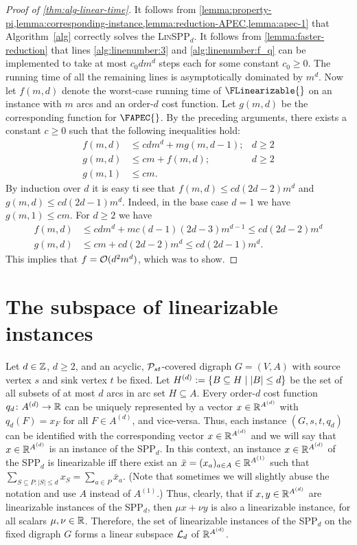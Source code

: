 \begin{proof}[Proof of \cref{thm:alg-linear-time}]
It follows from \cref{lemma:property-pi,lemma:corresponding-instance,lemma:reduction-APEC,lemma:apec-1} that Algorithm~\ref{alg} correctly solves the \textsc{Lin}SPP$_d$. It follows from \cref{lemma:faster-reduction} that lines \ref{alg:linenumber:3} and \ref{alg:linenumber:f_q} can be implemented to take at most $c_0dm^d$ steps each for some constant $c_0 \geq 0$. The running time of all the remaining lines is asymptotically dominated by $m^d$. Now let $f(m, d)$ denote the worst-case running time of $\FLinearizable{}$ on an instance with  $m$ arcs and an order-$d$  cost function.  Let $g(m, d)$ be the corresponding function for $\FAPEC{}$. By the preceding arguments, there exists a constant $c \geq 0$ such that the following inequalities hold:
\begin{align*}
    f(m ,d) &\leq cdm^d + mg(m, d-1); & d \geq 2\\
    g(m, d) &\leq cm + f(m, d); & d \geq 2\\
    g(m, 1) &\leq cm.
\end{align*}
By induction over $d$ it is easy ti see that $f(m, d) \leq cd(2d - 2)m^d$ and $g(m, d) \leq cd(2d - 1)m^d$. Indeed, in the base case $d = 1$ we have $g(m, 1) \leq cm$. For $d \geq 2$ we have 
\begin{align*}
    f(m, d) &\leq cdm^d + mc(d-1)(2d - 3)m^{d-1} \leq cd(2d - 2)m^d \\
    g(m, d) &\leq cm + cd(2d - 2)m^d \leq cd(2d -1)m^d. 
\end{align*}
This implies that $f = \mathcal{O}(d^2m^d)$, which was to show.
\end{proof}

\section{The subspace of linearizable instances}
\label{sec:subspace}

Let $d\in \mathbb{Z}$, $d\ge 2$, and an acyclic,  $\mathcal{P}_{st}$-covered  digraph  $G = (V, A)$ with source vertex $s$ and sink vertex $t$  be  fixed. 
Let $H^{(d)} := \{ B \subseteq H \mid |B| \leq d \}$ be the set of all subsets of at most $d$ arcs in arc set $H\subseteq A$.
Every order-$d$ cost function $q_d\colon A^{(d)}\to \mathbb{R}$ can be uniquely represented by a vector $x \in \mathbb{R}^{A^{(d)}}$ with $q_d(F)=x_F$ for all $F\in A^{(d)}$, and vice-versa. Thus, each instance $(G,s,t,q_d)$ can be identified with the corresponding vector $x\in \mathbb{R}^{A^{(d)}}$ and we will say that $x\in \mathbb{R}^{A^{(d)}}$ is an instance of the SPP$_d$.  In this context, an instance $x\in \mathbb{R}^{A^{(d)}}$ of the SPP$_d$ is linearizable iff there exist an $\bar{x} =(x_a)_{a\in A} \in \mathbb{R}^{A^{(1)}}$ such that $\sum_{S\subseteq P\colon |S|\le d} x_S=\sum_{a\in P}\bar{x}_a$. (Note that sometimes we will slightly abuse the notation and use $A$ instead of $A^{(1)}$.)
Thus, clearly,  that if $x,y \in \mathbb{R}^{A^{(d)}}$ are linearizable instances of the SPP$_d$, then $\mu x + \nu y$ is also a linearizable instance, for all scalars $\mu,\nu \in \mathbb{R}$.
Therefore, the set of linearizable instances of the SPP$_d$ on the fixed digraph  $G$ forms a linear subspace ${\cal L}_d$ of $\mathbb{R}^{A^{(d)}}$. 

